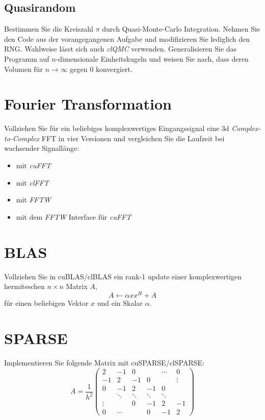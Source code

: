 \documentclass[headsepline=3pt,headinclude=true,12pt,oneside]{scrartcl}
\begin{document}
			\subsection{Quasirandom}
			Bestimmen Sie die Kreiszahl $\pi$ durch Quasi-Monte-Carlo Integration. Nehmen Sie den Code aus der vorangegangenen Aufgabe und modifizieren Sie lediglich den RNG. Wahlweise lässt sich auch \textit{clQMC} verwenden. Generalisieren Sie das Programm auf $n$-dimensionale Einheitskugeln und weisen Sie nach, dass deren Volumen für $n\rightarrow\infty$ gegen 0 konvergiert.
				
		\section{Fourier Transformation}
		Vollziehen Sie für ein beliebiges komplexwertiges Eingangssignal eine 3d \textit{Complex-to-Complex} FFT in vier Versionen und vergleichen Sie die Laufzeit bei wachsender Signallänge:
		\begin{itemize}
			\item mit \textit{cuFFT} 
			\item mit \textit{clFFT}
			\item mit \textit{FFTW}
			\item mit dem \textit{FFTW} Interface für \textit{cuFFT}
		\end{itemize}	
		
		\section{BLAS}
		Vollziehen Sie in cuBLAS/clBLAS ein rank-1 update einer komplexwertigen hermiteschen $n\times n$ Matrix $A$,
		\begin{equation}
			A \leftarrow \alpha xx^H + A
		\end{equation}		 
		für  einen beliebigen Vektor $x$ und ein Skalar $\alpha$.
		
		\section{SPARSE}
		Implementieren Sie folgende Matrix mit cuSPARSE/clSPARSE:
		\begin{equation}
			A = \frac1{h^2} 
			\begin{pmatrix}
				 2      & -1      &  0     &        & \cdots &  0      \\
				-1      &  2      & -1     &  0     &        &  \vdots \\
				 0      & -1      &  2     & -1     &  0     &         \\
			    	    &  \ddots & \ddots & \ddots & \ddots &         \\
			 	 \vdots &         &  0     & -1     &  2     & -1      \\
			 	0      & \cdots  &        &  0     & -1     &  2
			\end{pmatrix}
		\end{equation}
		
\end{document}
